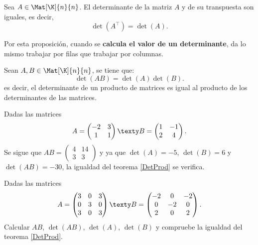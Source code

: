 \documentclass[compacto,10pt]{pubciencias-notas}
\begin{document}
\begin{prop}
    Sea $A \in \Mat[\K]{n}{n}$. El determinante de la matriz $A$ y de su transpuesta son iguales, es decir, 
    \[
        \det(A^\intercal) = \det(A).
    \]
\end{prop}

\begin{obs}
    Por esta proposición, cuando se \textbf{calcula el valor de un determinante}, da lo mismo trabajar por filas que trabajar por columnas.
\end{obs}

\begin{teo}\label{DetProd}
    Sean $A, B\in \Mat[\K]{n}{n}$, se tiene que:
    \[
        \det(AB) = \det(A)\det(B).
    \]
    es decir, el determinante de un producto de matrices es igual al producto de los determinantes de las matrices.
\end{teo}

\begin{ejem} Dadas las matrices 
\[
A = 
    \begin{pmatrix}
        -2 & 3 \\
        1 & 1
    \end{pmatrix}
\texty
B=
    \begin{pmatrix}
        1 & -1 \\
        2 & 4
    \end{pmatrix}.
\]
Se sigue que $AB = 
    \begin{pmatrix}
        4 & 14 \\
        3 & 3
    \end{pmatrix}$ y ya que $\det(A) = -5$, $\det(B) = 6$ y $\det(AB) = -30$, la igualdad del teorema \ref{DetProd} se verifica.
\end{ejem}

\begin{ejer}\hspace{0pt} Dadas las matrices
\[
A = 
    \begin{pmatrix}
        3 & 0 & 3 \\
        0 & 3 & 0 \\
        3 & 0 & 3
    \end{pmatrix}
\texty    
B = 
    \begin{pmatrix}
        -2 & 0 & -2 \\
        0 & -2 & 0 \\
        2 & 0 & 2
    \end{pmatrix}.
\]
Calcular $AB$, $\det(AB)$, $\det(A)$, $\det(B)$ y compruebe la igualdad del teorema \ref{DetProd}.
\end{ejer}
\end{document}
